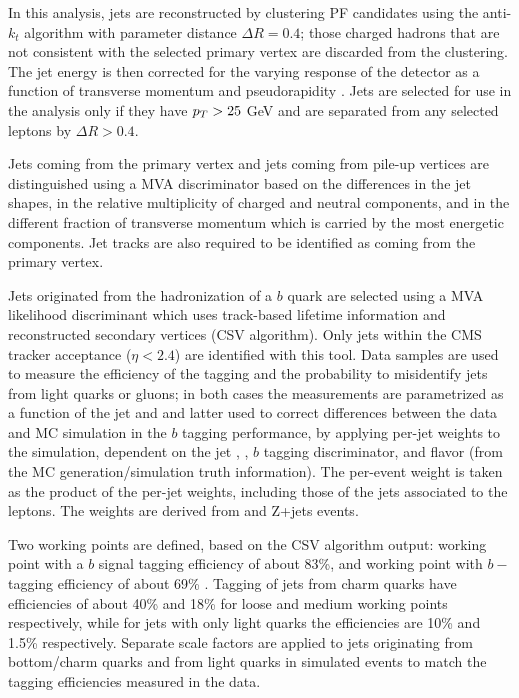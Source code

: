 In this analysis, jets are reconstructed by clustering PF candidates using the anti-$k_t$ algorithm with parameter distance $\Delta R=0.4$; those charged hadrons that are not consistent with the selected primary vertex are discarded from the clustering. The jet energy is then corrected for the varying response of the detector as a function of transverse momentum \pt and pseudorapidity \etac. Jets are selected for use in the analysis only if they have $p_T > 25$ GeV and are separated from any selected leptons by $\Delta R > 0.4$.

Jets coming from the primary vertex and jets coming from pile-up vertices are distinguished using a MVA discriminator based on the differences in the jet shapes, in the relative multiplicity of charged and neutral components, and in the different fraction of transverse momentum which is carried by the most energetic components. Jet tracks are also required to be identified as coming from the primary vertex.

Jets originated from the hadronization of a $b$ quark are selected using a MVA likelihood discriminant which uses track-based lifetime information and reconstructed secondary vertices (CSV algorithm). Only jets within the CMS tracker acceptance ($\eta < 2.4$) are identified with this tool. Data samples are used to measure the efficiency of the \bjet tagging and the probability to misidentify jets from light quarks or gluons; in both cases the measurements are parametrized as a function of the jet \pt and \etac and latter used to correct differences between the data and MC simulation in the $b$ tagging performance, by applying per-jet weights to the simulation, dependent on the jet \pt, \etac, $b$ tagging discriminator, and flavor (from the MC generation/simulation truth information)\cite{btag_corr}. The per-event weight is taken as the product of the per-jet weights, including those of the jets associated to the leptons. The weights are derived from \ttbar and Z+jets events.

Two working points are defined, based on the CSV algorithm output:  working point with a $b$ signal tagging efficiency of about 83\%, and  working point with $b-$tagging efficiency of about 69\% \cite{btag_points}. Tagging of jets from charm quarks have efficiencies of about 40\% and 18\% for loose and medium working points respectively, while for jets with only light quarks the efficiencies are 10\% and 1.5\% respectively. Separate scale factors are applied to jets originating from bottom/charm quarks and from light quarks in simulated events to match the tagging efficiencies measured in the data.


